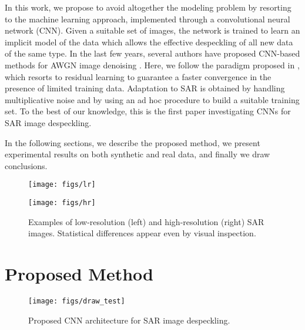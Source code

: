 \documentclass{article}
\begin{document}

In this work, we propose to avoid altogether the modeling problem by resorting to the machine learning approach, implemented through a convolutional neural network (CNN).
Given a suitable set of images,
the network is trained to learn an implicit model of the data which allows the effective despeckling of all new data of the same type.
In the last few years, several authors have proposed CNN-based methods for AWGN image denoising
\cite{Jain2009, Burger2012}.
Here, we follow the paradigm proposed in \cite{Zhang2016},
which resorts to residual learning to guarantee a faster convergence in the presence of limited training data.
Adaptation to SAR is obtained by handling multiplicative noise and by using an ad hoc procedure to build a suitable training set.
To the best of our knowledge, this is the first paper investigating CNNs for SAR image despeckling.

In the following sections, we describe the proposed method, we present experimental results on both synthetic and real data, and finally we draw conclusions.

\begin{figure}[t!]
	\begin{minipage}[b]{0.48\linewidth} \centerline{\texttt{[image: figs/lr]}} \end{minipage} \hfill
	\begin{minipage}[b]{0.48\linewidth} \centerline{\texttt{[image: figs/hr]}}	\end{minipage}
	\caption{Examples of low-resolution (left) and high-resolution (right) SAR images. Statistical differences appear even by visual inspection.}
	\label{fig:res}
\end{figure}


\section{Proposed Method}

\begin{figure*}[!t]
	\centerline{\texttt{[image: figs/draw\_test]}}
	\caption{Proposed CNN architecture for SAR image despeckling.}
	\label{fig:proposed_CNN}
\end{figure*}
\end{document}

